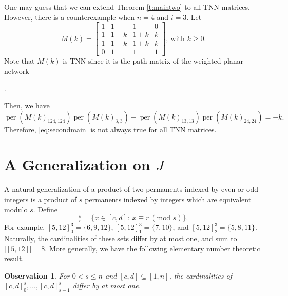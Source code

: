\documentclass[12pt]{amsart}
\newtheorem{obs}[thm]{Observation}
\theoremstyle{definition}
\numberwithin{equation}{section}
\DeclareMathOperator{\perm}{per}
\begin{document}
One may guess that we can extend Theorem \ref{t:maintwo} to all TNN matrices. However, there is a counterexample when $n=4$ and $i=3$. Let \begin{equation*}
    M(k) = \begin{bmatrix}
        1& 1& 1& 0 \\1& 1+k& 1+k& k \\ 1& 1+k& 1+k& k \\ 0& 1& 1& 1
    \end{bmatrix}, \ \text{with $k\geq 0$}.
\end{equation*} Note that $M(k)$ is TNN since it is the path matrix of the weighted planar network \begin{center}
    .
\end{center} Then, we have \begin{equation*}
    \perm(M(k)_{124,124})\perm(M(k)_{3,3}) - \perm(M(k)_{13,13})\perm(M(k)_{24,24})
    = -k.
\end{equation*} Therefore, \eqref{eq:secondmain} is not always true for all TNN matrices.

\section{A Generalization on $J$}\label{s:A gen on J}

A natural generalization of a product of two permanents indexed by even or odd integers is a product of $s$ permanents indexed by integers which are equivalent modulo $s$.
Define \begin{equation*}
    [c,d]_{r}^{s} = \{x\in [c,d] : \ x \equiv r \ (\text{mod } s) \}.
\end{equation*}
For example, $[5,12]_{0}^{3} = \{6, 9,12\}$, $[5,12]_{1}^{3} = \{7, 10\}$, and $[5,12]_{2}^{3} = \{5, 8, 11\}$.
Naturally, the cardinalities of these sets differ by at most one, and sum to $|[5,12]| = 8$.
More generally,
we have the following elementary number theoretic result.
\begin{obs}\label{o:r mod s counting}
    For $0<s\leq n$ and $[c,d]\subseteq [1, n]$, the cardinalities of $[c,d]_{0}^{s}, \dotsc, [c,d]_{s-1}^{s}$ differ by at most one.

\end{obs}
\end{document}
